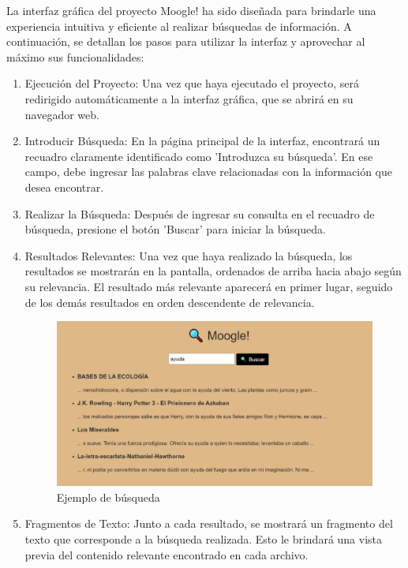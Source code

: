 \documentclass[a4paper, 12pt]{article}
\begin{document}
La interfaz gráfica del proyecto Moogle! ha sido diseñada para brindarle una experiencia intuitiva y eficiente al realizar búsquedas de información. A continuación, se detallan los pasos para utilizar la interfaz y aprovechar al máximo sus funcionalidades:
\begin{enumerate}
\item Ejecución del Proyecto:
   Una vez que haya ejecutado el proyecto, será redirigido automáticamente a la interfaz gráfica, que se abrirá en su navegador web.

\item Introducir Búsqueda:
   En la página principal de la interfaz, encontrará un recuadro claramente identificado como 'Introduzca su búsqueda'. En ese campo, debe ingresar las palabras clave relacionadas con la información que desea encontrar.


\item Realizar la Búsqueda:
   Después de ingresar su consulta en el recuadro de búsqueda, presione el botón 'Buscar' para iniciar la búsqueda.

\item Resultados Relevantes:
   Una vez que haya realizado la búsqueda, los resultados se mostrarán en la pantalla, ordenados de arriba hacia abajo según su relevancia. El resultado más relevante aparecerá en primer lugar, seguido de los demás resultados en orden descendente de relevancia. 
\begin{figure}[h]
       \center
       \includegraphics[width=14cm]{Web1.jpg}
       \caption{Ejemplo de búsqueda}
       \label{fig:example}
\end{figure}

\item Fragmentos de Texto:
   Junto a cada resultado, se mostrará un fragmento del texto que corresponde a la búsqueda realizada. Esto le brindará una vista previa del contenido relevante encontrado en cada archivo.


\end{enumerate}
\end{document}
